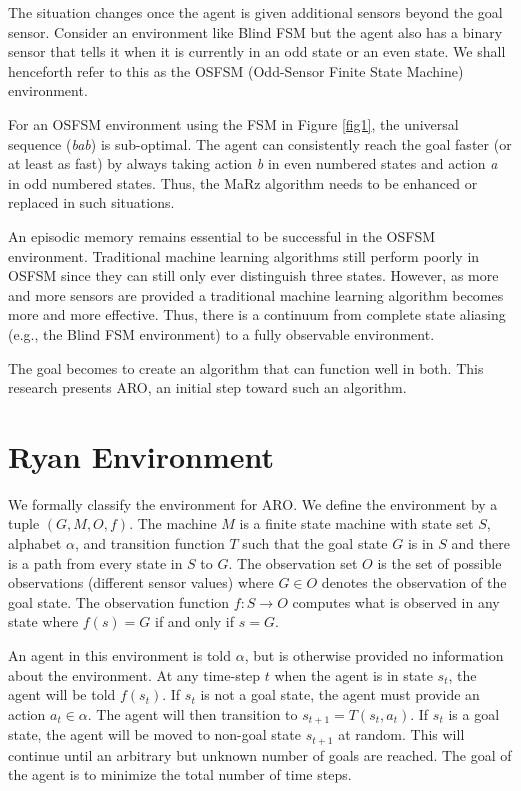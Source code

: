 \documentclass[letterpaper]{article} %
\begin{document}

The situation changes once the agent is given additional sensors
beyond the goal sensor.  Consider an environment like Blind FSM but
the agent also has a binary sensor that tells it when it is currently
in an odd state or an even state.  We shall henceforth refer to this
as the OSFSM (Odd-Sensor Finite State Machine) environment.

For an OSFSM environment using the FSM in Figure \ref{fig1}, the
universal sequence (\textit{bab}) is sub-optimal.  The agent can
consistently reach the goal faster (or at least as fast) by always
taking action \textit{b} in even numbered states and action \textit{a}
in odd numbered states.  Thus, the MaRz algorithm needs to be enhanced
or replaced in such situations.

An episodic memory remains essential to be successful in the OSFSM
environment.  Traditional machine learning algorithms still perform
poorly in OSFSM since they can still only ever distinguish three
states.  However, as more and more sensors are provided a traditional
machine learning algorithm becomes more and more effective.  Thus,
there is a continuum from complete state aliasing (e.g., the Blind FSM
environment) to a fully observable environment.

The goal becomes to create an algorithm that can function well in
both.  This research presents ARO, an initial step toward such an
algorithm.

\section{Ryan Environment}

We formally classify the environment for ARO. We define the environment by a tuple $(G, M, O, f)$. The machine $M$ is a finite state machine with state set $S$, alphabet $\alpha$, and transition function $T$ such that the goal state $G$ is in $S$ and there is a path from every state in $S$ to $G$. The observation set $O$ is the set of possible observations (different sensor values) where $G \in O$ denotes the observation of the goal state. The observation function $f: S \rightarrow O$ computes what is observed in any state where $f(s) = G$ if and only if $s = G$. 

An agent in this environment is told $\alpha$, but is otherwise provided no information about the environment. At any time-step $t$ when the agent is in state $s_t$, the agent will be told $f(s_t)$. If $s_t$ is not a goal state, the agent must provide an action $a_t \in \alpha$. The agent will then transition to $s_{t+1} = T(s_t, a_t)$. If $s_t$ is a goal state, the agent will be moved to non-goal state $s_{t+1}$ at random. This will continue until an arbitrary but unknown number of goals are reached. The goal of the agent is to minimize the total number of time steps.
\end{document}
